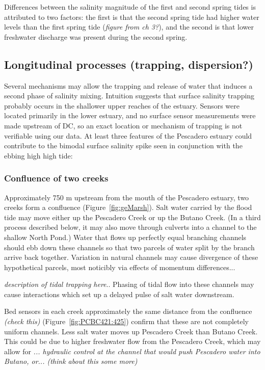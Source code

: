 Differences between the salinity magnitude of the first and second spring tides is attributed to two factors: the first is that the second spring tide had higher water levels than the first spring tide (\emph{figure from ch 3?}), and the second is that lower freshwater discharge was present during the second spring.  

\subsection{Longitudinal processes (trapping, dispersion?)}

Several mechanisms may allow the trapping and release of water that induces a second phase of salinity mixing. Intuition suggests that surface salinity trapping probably occurs in the shallower upper reaches of the estuary. Sensors were located primarily in the lower estuary, and no surface sensor measurements were made upstream of DC, so an exact location or mechanism of trapping is not verifiable using our data. At least three features of the Pescadero estuary could contribute to the bimodal surface salinity spike seen in conjunction with the ebbing high high tide:

\subsubsection{Confluence of two creeks}
Approximately 750 m upstream from the mouth of the Pescadero estuary, two creeks form a confluence (Figure~\ref{fig:geMarsh}). Salt water carried by the flood tide may move either up the Pescadero Creek or up the Butano Creek. (In a third process described below, it may also move through culverts into a channel to the shallow North Pond.) Water that flows up perfectly equal branching channels should ebb down these channels so that two parcels of water split by the branch arrive back together. Variation in natural channels may cause divergence of these hypothetical parcels, most noticibly via effects of momentum differences... 

 \emph{description of tidal trapping here}.. Phasing of tidal flow into these channels may cause interactions which set up a delayed pulse of salt water downstream. 

Bed sensors in each creek approximately the same distance from the confluence \emph{(check this)} (Figure~\ref{fig:PCBC421:425}) confirm that these are not completely uniform channels. Less salt water moves up Pescadero Creek than Butano Creek. This could be due to higher freshwater flow from the Pescadero Creek, which may allow for \emph{... hydraulic control at the channel that would push Pescadero water into Butano, or... (think about this some more)} 


